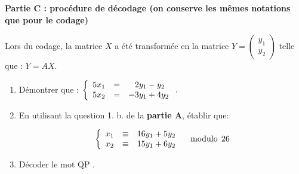 \documentclass[10pt]{article}
\begin{document}
\bigskip
 
\textbf{Partie C : procédure de décodage (on conserve les mêmes notations que pour le codage)}

\medskip
 
Lors du codage, la matrice $X$ a été transformée en la matrice  $Y = \begin{pmatrix}y_{1}\\y_{2}\end{pmatrix}$  telle que : $Y = A X$.

\medskip
 

\begin{enumerate}
\item Démontrer que : $\left\{\begin{array}{l c l}
5x_{1} &=& \phantom{-}2y_{1} - y_{2}\\ 
5x_{2} &=&- 3y_{1} + 4y_{2}
\end{array}\right..$ 
\item En utilisant la question 1. b. de la \textbf{partie A}, établir que:

\[\left\{\begin{array}{l c l}
x_{1}&\equiv&16y_{1} + 5y_{2}\\
x_{2}&\equiv&15y_{1} + 6y_{2}
\end{array}\right. \quad \text{modulo}\:\: 26\]
 
\item Décoder le mot \og QP \fg. 
\end{enumerate}
\end{document}
